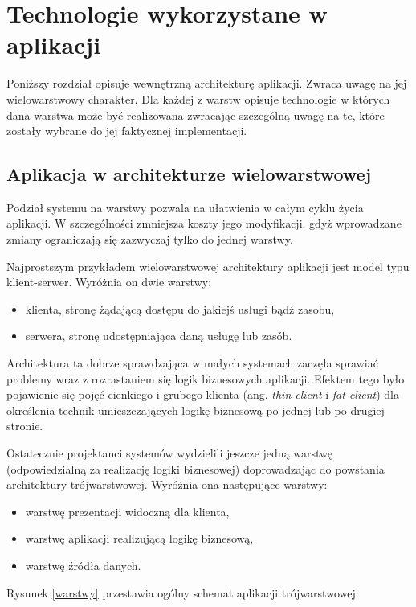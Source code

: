 \chapter{Technologie wykorzystane w aplikacji}
\label{chap4}
Poniższy rozdział opisuje wewnętrzną architekturę aplikacji. Zwraca uwagę na jej wielowarstwowy charakter. Dla każdej z warstw opisuje technologie w których dana warstwa może być realizowana zwracając szczególną uwagę na te, które zostały wybrane do jej faktycznej implementacji.

\section[Aplikacja w architekturze wielowarstwowej][Aplikacja w architekturze wielowarstwowej]{Aplikacja w architekturze wielowarstwowej}
Podział systemu na warstwy pozwala na ułatwienia w całym cyklu życia aplikacji. W szczególności zmniejsza koszty jego modyfikacji, gdyż wprowadzane zmiany ograniczają się zazwyczaj tylko do jednej warstwy. 

Najprostszym przykładem wielowarstwowej architektury aplikacji jest model typu klient-serwer. Wyróżnia on dwie warstwy:
\begin{itemize}
	\item klienta, stronę żądającą dostępu do jakiejś usługi bądź zasobu,
	\item serwera, stronę udostępniająca daną usługę lub zasób.
\end{itemize}
Architektura ta dobrze sprawdzająca w małych systemach zaczęła sprawiać problemy wraz z rozrastaniem się logik biznesowych aplikacji. Efektem tego było pojawienie się pojęć cienkiego i grubego klienta (ang. \textit{thin client} i \textit{fat client}) dla określenia technik umieszczających logikę biznesową po jednej lub po drugiej stronie.

Ostatecznie projektanci systemów wydzielili jeszcze jedną warstwę (odpowiedzialną za realizację logiki biznesowej) doprowadzając do powstania architektury trójwarstwowej. Wyróżnia ona następujące warstwy:
\begin{itemize}
	\item warstwę prezentacji widoczną dla klienta,
	\item warstwę aplikacji realizującą logikę biznesową,
	\item warstwę źródła danych.
\end{itemize}
Rysunek \ref{warstwy} przestawia ogólny schemat aplikacji trójwarstwowej.

